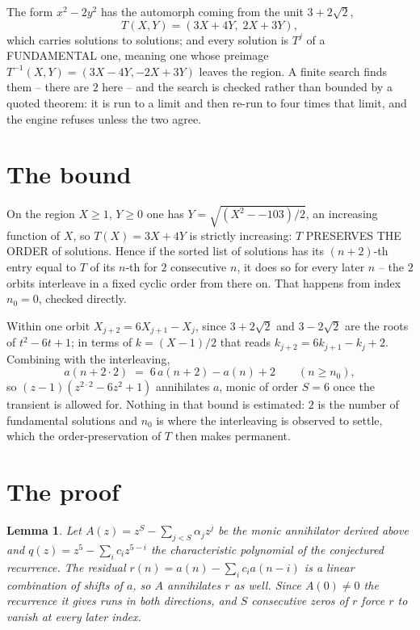 \documentclass[11pt,a4paper]{article}
\theoremstyle{plain}
\newtheorem{lemma}[theorem]{Lemma}
\theoremstyle{definition}
\begin{document}
The form $x^2-2y^2$ has the automorph coming from the unit $3+2\sqrt2$,
\[
T(X,Y)=(3X+4Y,\;2X+3Y),
\]
which carries solutions to solutions; and every solution is $T^{j}$ of a FUNDAMENTAL one,
meaning one whose preimage $T^{-1}(X,Y)=(3X-4Y,-2X+3Y)$ leaves the region. A finite search
finds them -- there are $2$ here -- and the search is checked rather than bounded by a quoted
theorem: it is run to a limit and then re-run to four times that limit, and the engine refuses
unless the two agree.

\section{The bound}

On the region $X\ge1$, $Y\ge0$ one has $Y=\sqrt{(X^2--103)/2}$, an increasing function of $X$,
so $T(X)=3X+4Y$ is strictly increasing: $T$ PRESERVES THE ORDER of solutions. Hence if the
sorted list of solutions has its $(n+2)$-th entry equal to $T$ of its $n$-th for $2$
consecutive $n$, it does so for every later $n$ -- the $2$ orbits interleave in a fixed cyclic
order from there on. That happens from index $n_0=0$, checked directly.

Within one orbit $X_{j+2}=6X_{j+1}-X_j$, since $3+2\sqrt2$ and $3-2\sqrt2$ are the roots of
$t^2-6t+1$; in terms of $k=(X-1)/2$ that reads $k_{j+2}=6k_{j+1}-k_j+2$. Combining with the
interleaving,
\[
a(n+2\cdot2)\;=\;6\,a(n+2)-a(n)+2 \qquad (n\ge n_0),
\]
so $(z-1)(z^{2\cdot2}-6z^{2}+1)$ annihilates $a$, monic of order $S=6$ once the
transient is allowed for. Nothing in that bound is estimated: $2$ is the number of fundamental
solutions and $n_0$ is where the interleaving is observed to settle, which the order-preservation
of $T$ then makes permanent.

\section{The proof}

\begin{lemma}\label{lem:crit}
Let $A(z)=z^S-\sum_{j<S}\alpha_jz^{j}$ be the monic annihilator derived above and
$q(z)=z^{5}-\sum_ic_iz^{5-i}$ the characteristic polynomial of the conjectured
recurrence. The residual $r(n)=a(n)-\sum_ic_ia(n-i)$ is a linear combination of shifts of $a$,
so $A$ annihilates $r$ as well. Since $A(0)\ne0$ the recurrence it gives runs in both
directions, and $S$ consecutive zeros of $r$ force $r$ to vanish at every later index.
\end{lemma}
\end{document}
